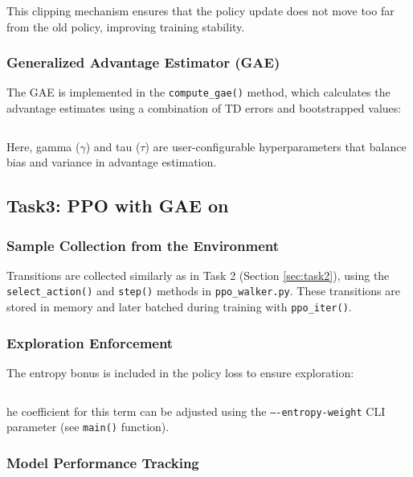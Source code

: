 This clipping mechanism ensures that the policy update does not move too far from the old policy, improving training stability.

\subsubsection{Generalized Advantage Estimator (GAE)}

The GAE is implemented in the \texttt{compute\_gae()} method, which calculates the advantage estimates using a combination of TD errors and bootstrapped values:
\inputminted[autogobble, firstline=96, lastline=104]{python}{../ppo_pendulum.py}

Here, gamma ($\gamma$) and tau ($\tau$) are user-configurable hyperparameters that balance bias and variance in advantage estimation.

\subsection{Task3: PPO with GAE on \walker}
\label{sec:task3}

\subsubsection{Sample Collection from the Environment}

Transitions are collected similarly as in Task 2 (Section \ref{sec:task2}), using the \texttt{select\_action()} and \texttt{step()} methods in \texttt{ppo\_walker.py}.
These transitions are stored in memory and later batched during training with \texttt{ppo\_iter()}.

\subsubsection{Exploration Enforcement}

The entropy bonus is included in the policy loss to ensure exploration:

\inputminted[autogobble, firstline=274, lastline=279, highlightlines=278]{python}{../ppo_walker.py}

he coefficient for this term can be adjusted using the \texttt{----entropy-weight} CLI parameter (see \texttt{main()} function).

\subsubsection{Model Performance Tracking}

